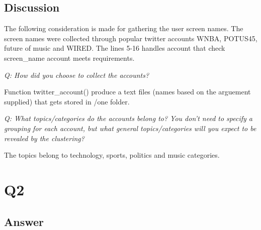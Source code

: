 \documentclass[12pt]{article}
\begin{document}
\subsection*{Discussion}

The following consideration is made for gathering the user screen names. The screen names were collected through popular twitter accounts WNBA, POTUS45, future of music and WIRED. The lines 5-16 handles account that check screen\_name account meets requirements.
 

\emph{Q: How did you choose to collect the accounts?}

Function twitter\_account() produce a text files (names based on the arguement supplied) that gets stored in /one folder.

 

\emph{Q: What topics/categories do the accounts belong to? You don't need to specify a grouping for each account, but what general topics/categories will you expect to be revealed by the clustering?}

The topics belong to technology, sports, politics and music categories.

\section*{Q2}

\subsection*{Answer}
\end{document}
